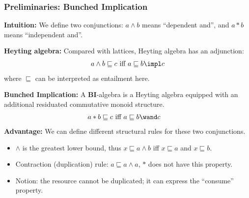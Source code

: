 \begin{frame}[fragile]
    \frametitle{Preliminaries: Bunched Implication}

\textbf{Intuition:} We define two conjunctions: $a \land b$ means ``dependent and'', and $a * b$ means ``independent and''.

    \textbf{Heyting algebra:} Compared with lattices, Heyting algebra has an adjunction:
    \begin{align*}
        a \land b \sqsubseteq c \text{ iff } a \sqsubseteq b \impl c
    \end{align*}\noindent
    where $\sqsubseteq$ can be interpreted as entailment here.
    
\textbf{Bunched Implication:}
    A \textbf{BI}-algebra is a Heyting algebra equipped with an additional residuated commutative monoid structure.
    \begin{align*}
        &a * b \sqsubseteq c \text{ iff } a \sqsubseteq b \wand c
    \end{align*}\noindent
\textbf{Advantage:} We can define different structural rules for these two conjunctions.
\begin{itemize}
    \item $\land$ is the greatest lower bound, thus $x \sqsubseteq a \land b$ iff $x \sqsubseteq a$ and $x \sqsubseteq b$.
    \item Contraction (duplication) rule: $a \sqsubseteq a \land a$, $*$ does not have this property.
    \item Notion: the resource cannot be duplicated; it can express the ``consume'' property.
\end{itemize}

\end{frame}

